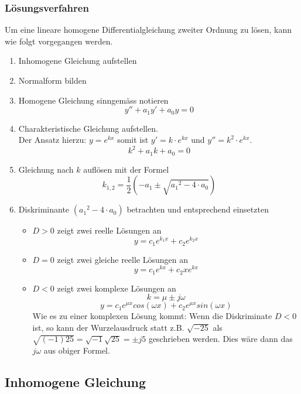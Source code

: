 \subsubsection{Lösungsverfahren}
Um eine lineare homogene Differentialgleichung zweiter Ordnung zu 
lösen, kann wie folgt vorgegangen werden.
\begin{enumerate}
  \item Inhomogene Gleichung aufstellen
  \item Normalform bilden
  \item Homogene Gleichung sinngemäss notieren
	\[ y'' + a_1y' + a_0y = 0 \]
  \item Charakteristische Gleichung aufstellen.\\
	Der Ansatz hierzu: $y=e^{kx}$ somit ist $y'=k\cdot e^{kx}$
	und $y''=k^2 \cdot e^{kx}$.
	\[ k^2 + a_1k + a_0 = 0 \]
  \item Gleichung nach $k$ auflösen mit der Formel
	\[ k_{1,2} = \frac{1}{2}\left(-a_1 \pm \sqrt{{a_1}^2 - 4 \cdot a_0}\right) \]
\item Diskriminante $({a_1}^2 - 4 \cdot a_0)$ betrachten und entsprechend einsetzten
	\begin{itemize}
	  \item $D > 0$ zeigt zwei reelle Lösungen an\\
		\[ y=c_1e^{k_1x} + c_2e^{k_2x} \]
          \item $D = 0$ zeigt zwei gleiche reelle Lösungen an\\
		\[ y=c_1e^{kx} + c_2xe^{kx} \]
          \item $D < 0$ zeigt zwei komplexe Lösungen an\\
		\[ k=\mu \pm j \omega \]
		\[ y=c_1e^{\mu x} cos(\omega x) + c_2e^{\mu x} sin(\omega x) \]
		Wie es zu einer komplexen Lösung kommt: 
		Wenn die Diskriminate $D < 0$ ist, so kann der Wurzelausdruck
		statt z.B. $\sqrt{-25}$ als 
		$\sqrt{(-1)25}=\sqrt{-1}\sqrt{25}=\pm j5$ geschrieben werden.
		Dies wäre dann das $j\omega$ aus obiger Formel.
	\end{itemize}
\end{enumerate}

\subsection{Inhomogene Gleichung}

